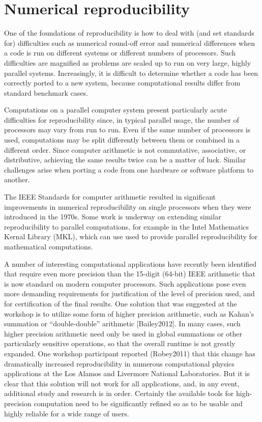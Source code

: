 \documentclass[11pt]{article}
\begin{document}
\section{Numerical reproducibility} \label{sec:numerical}
One of the foundations of reproducibility is how to deal with (and set
standards for) difficulties such as numerical round-off error and numerical
differences when a code is run on different systems or different numbers of
processors.  Such difficulties are magnified as problems are scaled up to
run on very large, highly parallel systems.  Increasingly, it is difficult
to determine whether a code has been correctly ported to a new system,
because computational results differ from standard benchmark cases.

Computations on a parallel computer system present particularly acute
difficulties for reproducibility since, in typical parallel usage, the
number of processors may vary from run to run.  Even if the same number of
processors is used, computations may be split differently between them or
combined in a different order.  Since computer arithmetic is not
commutative, associative, or distributive, achieving the same results
twice can be a matter of luck.  Similar challenges arise when porting
a code from one hardware or software platform to another.

The IEEE Standards for computer arithmetic resulted in significant
improvements in numerical reproducibility on single processors when they were
introduced in the 1970s.  Some work is underway on extending similar
reproducibility to parallel computations, for example in the Intel
Mathematics Kernal Library (MKL), which can use used to provide parallel
reproducibility for mathematical computations.

A number of interesting computational applications have recently been
identified that require even more precision than the 15-digit (64-bit) IEEE
arithmetic that is now standard on modern computer processors.  Such
applications pose even more demanding requirements for justification of the
level of precision used, and for certification of the final results.  One
solution that was suggested at the workshop is to utilize some form of
higher precision arithmetic, such as Kahan’s summation or “double-double”
arithmetic [Bailey2012].  In many cases, such higher precision arithmetic
need only be used in global summations or other particularly sensitive
operations, so that the overall runtime is not greatly expanded.  One
workshop participant reported (Robey2011) that this change has dramatically
increased reproducibility in numerous computational physics applications at
the Los Alamos and Livermore National Laboratories.  
But it is clear that this solution will not work for all applications, and,
in any event, additional study and research is in order.  Certainly the
available tools for high-precision computation need to be significantly
refined so as to be usable and highly reliable for a wide range of users.
\end{document}
